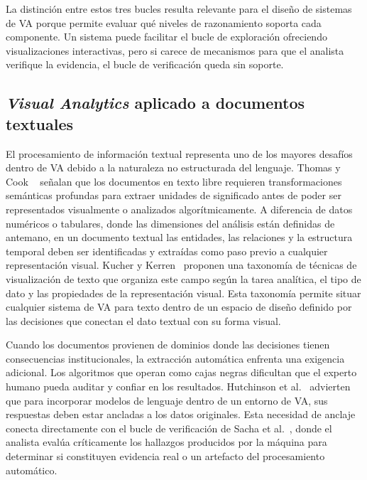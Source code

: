 La distinción entre estos tres bucles resulta relevante 
para el diseño de sistemas de \ac{VA} porque permite 
evaluar qué niveles de razonamiento soporta cada 
componente. Un sistema puede facilitar el 
bucle de exploración ofreciendo visualizaciones 
interactivas, pero si carece de mecanismos para que el 
analista verifique la evidencia, el bucle de verificación 
queda sin soporte. 





\subsection{\textit{Visual Analytics} aplicado a documentos 
textuales}
\label{sec:va_texto}

El procesamiento de información textual representa uno 
de los mayores desafíos dentro de \ac{VA} debido a la 
naturaleza no estructurada del lenguaje. 
Thomas y Cook  ~\cite{thomas2005illuminating} señalan que 
los documentos en texto libre requieren transformaciones 
semánticas profundas para extraer unidades de significado 
antes de poder ser representados visualmente o analizados 
algorítmicamente. A diferencia de datos numéricos o 
tabulares, donde las dimensiones del análisis están 
definidas de antemano, en un documento textual las 
entidades, las relaciones y la estructura temporal deben 
ser identificadas y extraídas como paso previo a 
cualquier representación visual. 
Kucher y Kerren~\cite{kucher2015text} proponen una 
taxonomía de técnicas de visualización de texto que 
organiza este campo según la tarea analítica, el tipo 
de dato y las propiedades de la representación visual. 
Esta taxonomía permite situar cualquier sistema de 
\ac{VA} para texto dentro de un espacio de diseño 
definido por las decisiones que conectan el dato textual 
con su forma visual.

Cuando los documentos provienen de dominios donde las 
decisiones tienen consecuencias institucionales, la 
extracción automática enfrenta una exigencia adicional. 
Los algoritmos que operan como cajas negras dificultan 
que el experto humano pueda auditar y confiar en los 
resultados. Hutchinson et al.~\cite{hutchinson2024llm} 
advierten que para incorporar modelos de lenguaje dentro 
de un entorno de \ac{VA}, sus respuestas deben estar 
ancladas a los datos originales. Esta necesidad de 
anclaje conecta directamente con el bucle de verificación 
de Sacha et al.~\cite{sacha2014}, donde el analista 
evalúa críticamente los hallazgos producidos por la 
máquina para determinar si constituyen evidencia real o 
un artefacto del procesamiento automático.

